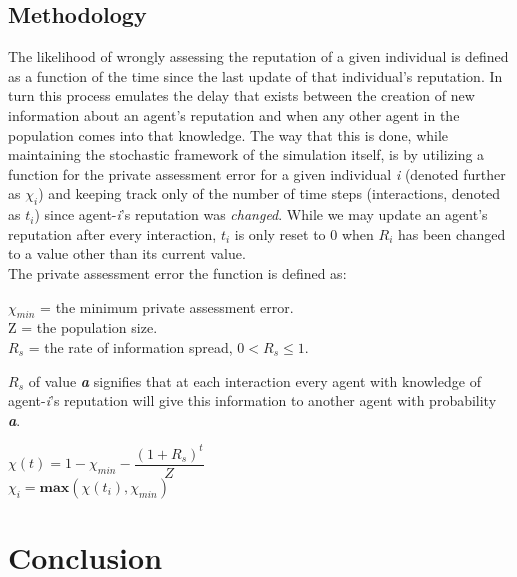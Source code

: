 \documentclass[10pt,a4paper]{article}
\begin{document}
\subsection{Methodology}
The likelihood of wrongly assessing the reputation of a given individual is defined as a function of the time since the last update of that individual's reputation.
In turn this process emulates the delay that exists between the creation of new information about an agent's reputation and when any other agent in the population comes into that knowledge.
The way that this is done, while maintaining the stochastic framework of the simulation itself, is by utilizing a function for the private assessment error for a given individual \textit{i} (denoted further as $\chi_{i}$) and keeping track only of the number of time steps (interactions, denoted as $\textit{t}_{i}$) since agent-\textit{i}'s reputation was \emph{changed}.
While we may update an agent's reputation after every interaction, $\textit{t}_{i}$ is only reset to 0 when $R_{i}$ has been changed to a value other than its current value.
\\
The private assessment error the function is defined as: \\
\begin{addmargin}[1em]{2em}
$\chi_{min}$ = the minimum private assessment error. \\
Z = the population size. \\
$R_{s}$ = the rate of information spread, $0 < R_{s} \leq 1$. 
\begin{addmargin}[2em]{1em}
$R_{s}$ of value \textbf{\textit{a}} signifies that at each interaction every agent with knowledge of agent-\textit{i}'s reputation will give this information to another agent with probability \textbf{\textit{a}}.
\end{addmargin}
\end{addmargin}
\begin{center}
$ \chi(t) = 1 - \chi_{min} - \dfrac{(1 + R_{s})^{t}}{Z}$ \\
$ \chi_{i} = \textbf{max}(\chi(t_{i}), \chi_{min}) $
\end{center}

\section{Conclusion}
\end{document}
